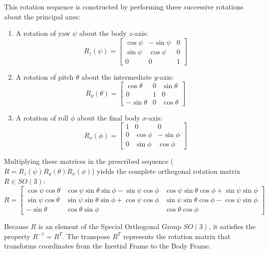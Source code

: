This rotation sequence is constructed by performing three successive rotations about the principal axes:
\begin{enumerate}
    \item A rotation of yaw $\psi$ about the body $z$-axis:
    \begin{equation}
    R_z(\psi) = \begin{bmatrix} \cos\psi & -\sin\psi & 0 \\ \sin\psi & \cos\psi & 0 \\ 0 & 0 & 1 \end{bmatrix}
    \end{equation}
    \item A rotation of pitch $\theta$ about the intermediate $y$-axis:
    \begin{equation}
    R_y(\theta) = \begin{bmatrix} \cos\theta & 0 & \sin\theta \\ 0 & 1 & 0 \\ -\sin\theta & 0 & \cos\theta \end{bmatrix}
    \end{equation}
    \item A rotation of roll $\phi$ about the final body $x$-axis:
    \begin{equation}
    R_x(\phi) = \begin{bmatrix} 1 & 0 & 0 \\ 0 & \cos\phi & -\sin\phi \\ 0 & \sin\phi & \cos\phi \end{bmatrix}
    \end{equation}
\end{enumerate}

Multiplying these matrices in the prescribed sequence ($R = R_z(\psi) R_y(\theta) R_x(\phi)$) yields the complete orthogonal rotation matrix $R \in SO(3)$:
\begin{equation}
R = \begin{bmatrix} \cos\psi\cos\theta & \cos\psi\sin\theta\sin\phi - \sin\psi\cos\phi & \cos\psi\sin\theta\cos\phi + \sin\psi\sin\phi \\ \sin\psi\cos\theta & \sin\psi\sin\theta\sin\phi + \cos\psi\cos\phi & \sin\psi\sin\theta\cos\phi - \cos\psi\sin\phi \\ -\sin\theta & \cos\theta\sin\phi & \cos\theta\cos\phi \end{bmatrix}
\end{equation}

Because $R$ is an element of the Special Orthogonal Group $SO(3)$, it satisfies the property $R^{-1} = R^T$. The transpose $R^T$ represents the rotation matrix that transforms coordinates from the Inertial Frame to the Body Frame.

